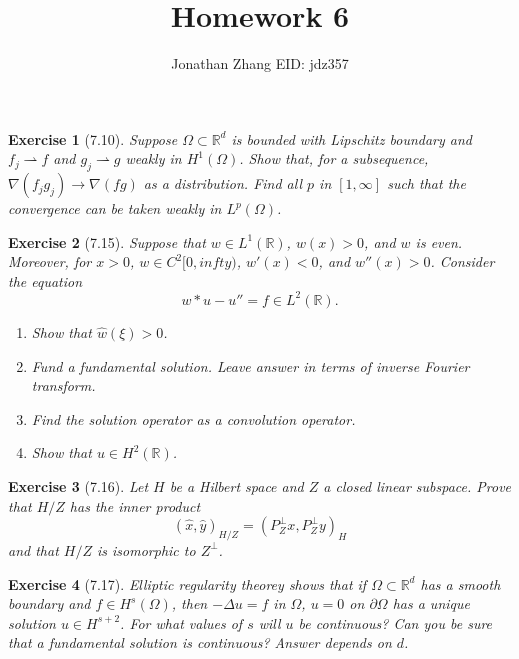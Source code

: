 \documentclass[letterpaper,twoside,11pt]{article}
\theoremstyle{mystyle}
\newtheorem*{exercise}{Exercise}
\newcommand{\R}{{\mathbb R}}
\begin{document}
\title{\vspace{-2\baselineskip} 
Homework 6
}
\author{Jonathan Zhang \qquad EID: { jdz357} }
\date{}
\maketitle



\begin{exercise}[7.10]
Suppose $\Omega\subset \R^d$ is bounded with Lipschitz boundary and $f_j \rightharpoonup f$ and $g_j\rightharpoonup g$ weakly in $H^1\left( \Omega \right)$. Show that, for a subsequence, $\nabla \left( f_jg_j \right) \to \nabla (fg)$ as a distribution. Find all $p$ in $[1,\infty]$ such that the convergence can be taken weakly in $L^p\left( \Omega \right)$. 
\end{exercise}







\begin{exercise}[7.15]
Suppose that $w \in L^1\left( \R \right)$, $w(x) > 0$, and $w$ is even. Moreover, for $x > 0$, $w \in C^2[0, infty)$, $w'(x) < 0$, and $w''(x) >0$. Consider the equation 
\[w\ast u - u'' = f\in L^2\left( \R \right).\]
\begin{enumerate}
  \item Show that $\hat w \left( \xi \right) >0$. 
  \item Fund a fundamental solution. Leave answer in terms of inverse Fourier transform. 
  \item Find the solution operator as a convolution operator. 
  \item Show that $u \in H^2\left( \R \right)$. 
\end{enumerate}
\end{exercise}



\begin{exercise}[7.16]
  Let $H$ be a Hilbert space and $Z$ a closed linear subspace. Prove that $H/Z$ has the inner product 
  \[\left( \hat x, \hat y \right)_{H/Z} = \left( P_Z^{\perp} x,P_Z^{\perp} y  \right)_H\]
  and that $H/Z$ is isomorphic to $Z^\perp$.

\end{exercise}



\begin{exercise}[7.17]
  Elliptic regularity theorey shows that if $\Omega \subset \R^d$ has a smooth boundary and $f \in H^s\left( \Omega \right)$, then $-\Delta u = f$ in $\Omega$, $u = 0$ on $\partial \Omega$ has a unique solution $u \in H^{s+2}$. For what values of $s$ will $u$ be continuous? Can you be sure that a fundamental solution is continuous? Answer depends on $d$. 

\end{exercise}
\end{document}
